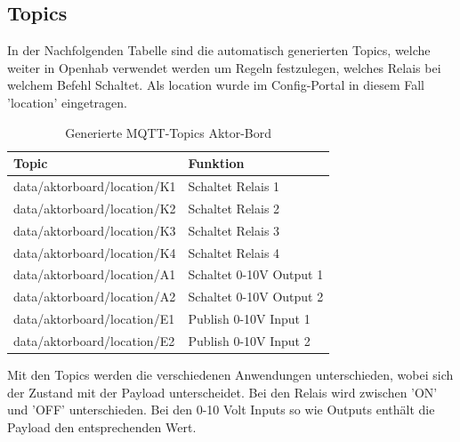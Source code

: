 \subsection{Topics}
In der Nachfolgenden Tabelle sind die automatisch generierten Topics, welche weiter in Openhab verwendet werden um Regeln festzulegen, welches Relais bei welchem Befehl Schaltet. Als location wurde im Config-Portal in diesem Fall 'location' eingetragen.
\begin{table}[H]
	\centering
	\begin{tabular}{|l|l|}
		\hline 
		 Topic  & Funktion  \\ 
		\hline 
		data/aktorboard/location/K1 & Schaltet Relais 1  \\ 
		\hline
		data/aktorboard/location/K2 & Schaltet Relais 2  \\ 
		\hline
		data/aktorboard/location/K3 & Schaltet Relais 3  \\ 
		\hline
		data/aktorboard/location/K4 & Schaltet Relais 4  \\ 
		\hline 
		data/aktorboard/location/A1 & Schaltet 0-10V Output 1  \\ 
		\hline
		data/aktorboard/location/A2 & Schaltet 0-10V Output 2  \\ 
		\hline
		data/aktorboard/location/E1 & Publish 0-10V Input 1  \\ 
		\hline
		data/aktorboard/location/E2 & Publish 0-10V Input 2  \\ 
		\hline
	\end{tabular} 	
\caption{Generierte MQTT-Topics Aktor-Bord}
\label{tab: MQTT-Topics Aktor}
\end{table}
 
 Mit den Topics werden die verschiedenen Anwendungen unterschieden, wobei sich der Zustand mit der Payload unterscheidet. Bei den Relais wird zwischen 'ON' und 'OFF' unterschieden. Bei den 0-10 Volt Inputs so wie Outputs enthält die Payload den entsprechenden Wert. 
